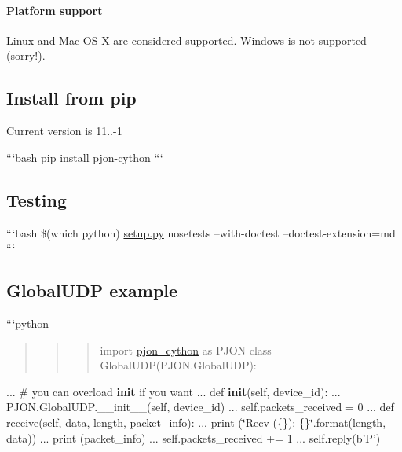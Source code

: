 \paragraph*{Platform support}

Linux and Mac O\-S X are considered supported. Windows is not supported (sorry!).

\subsection*{Install from pip}

Current version is 11..-\/1

```bash pip install pjon-\/cython ```

\subsection*{Testing}

```bash \$(which python) \hyperlink{setup_8py}{setup.\-py} nosetests --with-\/doctest --doctest-\/extension=md ```

\subsection*{Global\-U\-D\-P example}

```python \begin{quotation}
\begin{quotation}
\begin{quotation}
import \hyperlink{namespacepjon__cython}{pjon\-\_\-cython} as P\-J\-O\-N class Global\-U\-D\-P(P\-J\-O\-N.\-Global\-U\-D\-P)\-:

\end{quotation}


\end{quotation}


\end{quotation}
... \# you can overload {\bfseries init} if you want ... def {\bfseries init}(self, device\-\_\-id)\-: ... P\-J\-O\-N.\-Global\-U\-D\-P.\-\_\-\-\_\-init\-\_\-\-\_\-(self, device\-\_\-id) ... self.\-packets\-\_\-received = 0 ... def receive(self, data, length, packet\-\_\-info)\-: ... print (\char`\"{}\-Recv (\{\})\-: \{\}\char`\"{}.format(length, data)) ... print (packet\-\_\-info) ... self.\-packets\-\_\-received += 1 ... self.\-reply(b'P')


